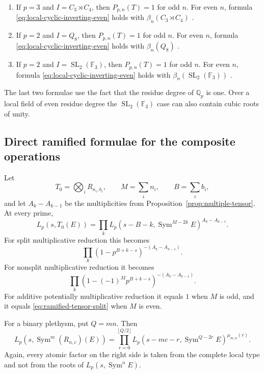 \documentclass[11pt,reqno]{amsart}
\theoremstyle{definition}
\theoremstyle{remark}
\newcommand{\Q}{\mathbb Q}
\newcommand{\SL}{\operatorname{SL}}
\newcommand{\Sym}{\operatorname{Sym}}
\begin{document}
\begin{enumerate}
\item If $p=3$ and $I=C_3\rtimes C_4$, then $P_{p,n}(T)=1$ for odd $n$.
For even $n$, formula \eqref{eq:local-cyclic-inverting-even} holds with
$\beta_n(C_3\rtimes C_4)$ \cite[Section~11]{DMW}.

\item If $p=2$ and $I=Q_8$, then $P_{p,n}(T)=1$ for odd $n$.  For even $n$,
formula \eqref{eq:local-cyclic-inverting-even} holds with $\beta_n(Q_8)$
\cite[Proposition~8.1]{DMW}.

\item If $p=2$ and $I=\SL_2(\mathbb F_3)$, then $P_{p,n}(T)=1$ for odd $n$.
For even $n$, formula \eqref{eq:local-cyclic-inverting-even} holds with
$\beta_n(\SL_2(\mathbb F_3))$ \cite[Section~10]{DMW}.
\end{enumerate}

The last two formulae use the fact that the residue degree of $\Q_p$ is one.
Over a local field of even residue degree the $\SL_2(\mathbb F_3)$ case can
also contain cubic roots of unity.

\subsection{Direct ramified formulae for the composite operations}

Let
\begin{equation*}
 T_0=\bigotimes_iR_{n_i,b_i},\qquad
 M=\sum_i n_i,\qquad B=\sum_i b_i,
\end{equation*}
and let $A_k-A_{k-1}$ be the multiplicities from
Proposition~\ref{prop:multiple-tensor}.  At every prime,
\begin{equation}\label{eq:ramified-tensor-master}
 L_p(s,T_0(E))
 =
 \prod_k
 L_p(s-B-k,\Sym^{M-2k}E)^{A_k-A_{k-1}}.
\end{equation}
For split multiplicative reduction this becomes
\begin{equation}\label{eq:ramified-tensor-split}
 \prod_k(1-p^{B+k-s})^{-(A_k-A_{k-1})}.
\end{equation}
For nonsplit multiplicative reduction it becomes
\begin{equation}\label{eq:ramified-tensor-nonsplit}
 \prod_k
 (1-(-1)^Mp^{B+k-s})^{-(A_k-A_{k-1})}.
\end{equation}
For additive potentially multiplicative reduction it equals $1$ when $M$ is
odd, and it equals \eqref{eq:ramified-tensor-split} when $M$ is even.

For a binary plethysm, put $Q=mn$.  Then
\begin{equation}\label{eq:ramified-plethysm-master}
 L_p(s,\Sym^m(R_{n,c})(E))
 =
 \prod_{r=0}^{\lfloor Q/2\rfloor}
 L_p(s-mc-r,\Sym^{Q-2r}E)^{\mu_{m,n}(r)}.
\end{equation}
Again, every atomic factor on the right side is taken from the complete local
type and not from the roots of $L_p(s,\Sym^nE)$.
\end{document}

